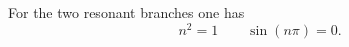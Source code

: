 \documentclass{article}
\begin{document}
For the two resonant branches one has
\begin{equation}
n^2=1 \qquad \sin(n\pi)=0.\label{branches}
\end{equation}
\end{document}
